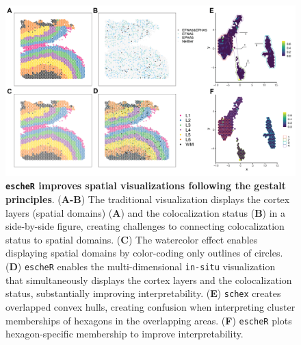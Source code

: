 \documentclass[11pt]{article}
\begin{document}
\clearpage

\begin{figure}
\begin{center}
\includegraphics[width=\textwidth]{Manuscript/figure/fig_grid.png}
\end{center}
\caption{\footnotesize \textbf{\texttt{escheR} improves spatial visualizations following the gestalt principles}. (\textbf{A-B}) The traditional visualization displays the cortex layers (spatial domains) (\textbf{A}) and the colocalization status (\textbf{B}) in a side-by-side figure, creating challenges to connecting colocalization status to spatial domains. (\textbf{C}) The watercolor effect enables displaying spatial domains by color-coding only outlines of circles. (\textbf{D}) \texttt{escheR} enables the multi-dimensional \texttt{in-situ} visualization that simultaneously displays the cortex layers and the colocalization status, substantially improving interpretability. (\textbf{E}) \texttt{schex} creates overlapped convex hulls, creating confusion when interpreting cluster memberships of hexagons in the overlapping areas. (\textbf{F}) \texttt{escheR} plots hexagon-specific membership to improve interpretability.}
\label{fig:visual} 
\end{figure}


\clearpage 

\end{document}
